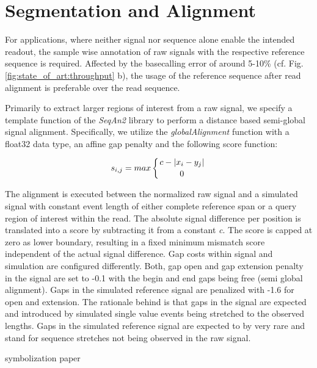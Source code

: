 \section{Segmentation and Alignment}
\label{sec:signal:alignment}

For applications, where neither signal nor sequence alone enable the intended readout, the sample wise annotation of raw signals with the respective reference sequence is required. Affected by the basecalling error of around 5-10\% (cf. Fig. \ref{fig:state_of_art:throughput} b), the usage of the reference sequence after read alignment is preferable over the read sequence.

Primarily to extract larger regions of interest from a raw signal, we specify a template function of the \textit{SeqAn2} \cite{Reinert2017} library to perform a distance based semi-global signal alignment. Specifically, we utilize the \textit{globalAlignment} function with a float32 data type, an affine gap penalty and the following score function:

\begin{equation}
s_{i,j} = max \left\lbrace c - \left| x_{i} - y_{j} \right| \atop 0 \right.
\end{equation}

The alignment is executed between the normalized raw signal and a simulated signal with constant event length of either complete reference span or a query region of interest within the read.
The absolute signal difference per position is translated into a score by subtracting it from a constant \textit{c}. The score is capped at zero as lower boundary, resulting in a fixed minimum mismatch score independent of the actual signal difference.
Gap costs within signal and simulation are configured differently. Both, gap open and gap extension penalty in the signal are set to -0.1 with the begin and end gaps being free (semi global alignment). Gaps in the simulated reference signal are penalized with -1.6 for open and extension. 
The rationale behind is that gaps in the signal are expected and introduced by simulated single value events being stretched to the observed lengths. Gaps in the simulated reference signal are expected to by very rare and stand for sequence stretches not being observed in the raw signal.





symbolization paper \cite{Lin2003}

